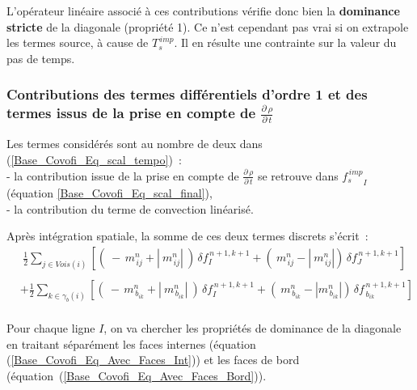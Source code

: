 L'op\'erateur lin\'eaire associ\'e \`a ces contributions
v\'erifie donc bien la {\bf dominance stricte} de la diagonale (propri\'et\'e
1). Ce n'est cependant pas vrai si on extrapole les termes source, \`{a} cause de
$T_s^{\,imp}$. Il en r\'{e}sulte une contrainte sur la valeur du pas de temps.

%
\subsubsection*{Contributions  des termes
diff\'erentiels d'ordre 1 et des termes issus de la prise en compte de
$\displaystyle \frac {{\partial}\,\rho}{{\partial}\,t}$}
\label{Base_Covofi_Contributionsdrhodtconvection}
Les termes consid\'er\'es sont au nombre de deux dans
(\ref{Base_Covofi_Eq_scal_tempo})~:\\
\hspace*{1cm}- la contribution issue de la prise en compte de $\displaystyle
\frac
{{\partial}\,\rho}{{\partial}\,t}$ se retrouve dans ${f_s^{\,imp}}_I $
(\'equation \ref{Base_Covofi_Eq_scal_final}),\\
\hspace*{1cm}- la contribution du terme de convection
lin\'earis\'e.


Apr\`es int\'{e}gration spatiale, la somme de ces deux termes discrets s'\'ecrit~:\\
\begin{equation}
\begin{array}{lll}\label{Base_Covofi_Eq_Avec_Faces_Int}
&\displaystyle \frac{1}{2}\sum\limits_{j\in Vois(i)}\left[(\ -\,m_{\,ij}^n + |\
m_{\,ij}^n|\ )\,\delta f_I^{\,n+1,k+1}+ (\ m_{\,ij}^n - |\ m_{\,ij}^n|)\,\delta f_J^{\,n+1,k+1}\right]\\
\end{array}
\end{equation}
\begin{equation}\label{Base_Covofi_Eq_Avec_Faces_Bord}
\begin{array}{lll}
&+\displaystyle\frac{1}{2}\sum\limits_{k\in {\gamma_b(i)}}\left[(\ -\,
m_{\,{b}_{ik}}^n + |\ m_{\,{b}_{ik}}^n|\ )\,\delta f_I^{\,n+1,k+1} + (\
m_{\,{b}_{ik}}^n - |m_{\,{b}_{ik}}^n|)\,\delta f_{\,{b}_{ik}}^{\,n+1,k+1}\right]\\
\end{array}
\end{equation}

Pour chaque ligne $I$, on va chercher les propri\'et\'es de dominance de la
diagonale en traitant s\'epar\'ement les faces internes (\'equation
(\ref{Base_Covofi_Eq_Avec_Faces_Int})) et les faces de bord
(\'equation~(\ref{Base_Covofi_Eq_Avec_Faces_Bord})).

